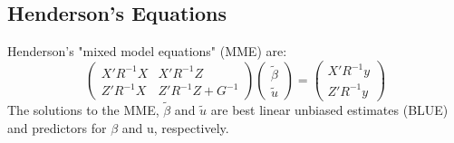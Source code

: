 
\subsection{Henderson's Equations}

Henderson's "mixed model equations" (MME) are:
\[
\begin{pmatrix}  X'R^{-1}X & X'R^{-1}Z \\ Z'R^{-1}X & Z'R^{-1}Z + G^{-1} 
\end{pmatrix}\begin{pmatrix}  \tilde{\beta} \\ \tilde{u}
\end{pmatrix}=\begin{pmatrix} X'R^{-1}y  \\ Z'R^{-1}y
\end{pmatrix}
\]
The solutions to the MME, $\textstyle\tilde{\beta}$ and $\textstyle\tilde{u}$ are 
best linear unbiased estimates (BLUE) and predictors for $\beta$ and u, respectively. 


